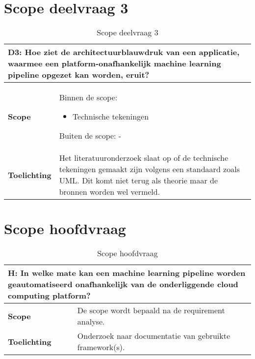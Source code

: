 \section{Scope deelvraag 3}\label{appendix:scope-subquestion-3}
\begin{table}[hbt!]
  \centering
  \caption{Scope deelvraag 3}
  \vspace*{.5\baselineskip}
  \begin{tabular}{|p{.215\linewidth}|p{.72\linewidth}|}
  \hline
  \multicolumn{2}{|p{.97\linewidth}|}{\textbf{D3: Hoe ziet de architectuurblauwdruk van een applicatie, waarmee een platform-onafhankelijk machine learning pipeline opgezet kan worden, eruit?}} \\ \hline
    \textbf{Scope}&
      Binnen de scope:
      \begin{itemize}
        \item Technische tekeningen
      \end{itemize}
      Buiten de scope:
      -
    \\ \hline
    \textbf{Toelichting}&
      Het literatuuronderzoek slaat op of de technische tekeningen gemaakt zijn volgens een standaard zoals UML. Dit komt niet terug als theorie maar de bronnen worden wel vermeld.
    \\ \hline
  \end{tabular}
  \label{table:scope-subquestion-3}
\end{table}

\newpage

\section{Scope hoofdvraag}\label{appendix:scope-main-question}
\begin{table}[hbt!]
  \centering
  \caption{Scope hoofdvraag}
  \vspace*{.5\baselineskip}
  \begin{tabular}{|p{.215\linewidth}|p{.72\linewidth}|}
  \hline
  \multicolumn{2}{|p{.97\linewidth}|}{\textbf{H: In welke mate kan een machine learning pipeline worden geautomatiseerd onafhankelijk van de onderliggende cloud computing platform?}} \\ \hline
    \textbf{Scope}&
      De scope wordt bepaald na de requirement analyse.
    \\ \hline
    \textbf{Toelichting}&
      Onderzoek naar documentatie van gebruikte framework(s).
    \\ \hline
  \end{tabular}
  \label{table:scope-main-question}
\end{table}


